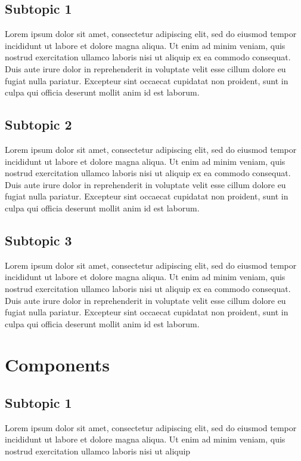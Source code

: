 \documentclass[a4paper,12 pt,oneside]{book}
\begin{document}
\section{Subtopic 1}

Lorem ipsum dolor sit amet, consectetur adipiscing elit, sed do eiusmod tempor incididunt ut labore et dolore magna aliqua. Ut enim ad minim veniam, quis nostrud exercitation ullamco laboris nisi ut aliquip ex ea commodo consequat. Duis aute irure dolor in reprehenderit in voluptate velit esse cillum dolore eu fugiat nulla pariatur. Excepteur sint occaecat cupidatat non proident, sunt in culpa qui officia deserunt mollit anim id est laborum.


\section{Subtopic 2}

Lorem ipsum dolor sit amet, consectetur adipiscing elit, sed do eiusmod tempor incididunt ut labore et dolore magna aliqua. Ut enim ad minim veniam, quis nostrud exercitation ullamco laboris nisi ut aliquip ex ea commodo consequat. Duis aute irure dolor in reprehenderit in voluptate velit esse cillum dolore eu fugiat nulla pariatur. Excepteur sint occaecat cupidatat non proident, sunt in culpa qui officia deserunt mollit anim id est laborum.

\section{Subtopic 3}

Lorem ipsum dolor sit amet, consectetur adipiscing elit, sed do eiusmod tempor incididunt ut labore et dolore magna aliqua. Ut enim ad minim veniam, quis nostrud exercitation ullamco laboris nisi ut aliquip ex ea commodo consequat. Duis aute irure dolor in reprehenderit in voluptate velit esse cillum dolore eu fugiat nulla pariatur. Excepteur sint occaecat cupidatat non proident, sunt in culpa qui officia deserunt mollit anim id est laborum.


\chapter{Components}

\section{Subtopic 1}
Lorem ipsum dolor sit amet, consectetur adipiscing elit, sed do eiusmod tempor incididunt ut labore et dolore magna aliqua. Ut enim ad minim veniam, quis nostrud exercitation ullamco laboris nisi ut aliquip 
\end{document}
